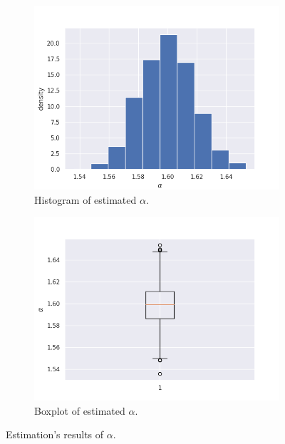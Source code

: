 \documentclass{article}
\begin{document}
	\begin{figure}
		\centering
		\begin{subfigure}[H]{0.49\textwidth}
			\centering
			\includegraphics[width=1\linewidth]{images/cf_alpha_estimation_hist}
			\caption{Histogram of estimated $\alpha$.}\label{9}
		\end{subfigure}
		\hfill
		\begin{subfigure}[H]{0.49\textwidth}
			\centering
			\includegraphics[width=1\linewidth]{images/cf_alpha_estimation_boxplot}
			\caption{Boxplot of estimated $\alpha$.}\label{10}
		\end{subfigure}\caption{Estimation's results of $\alpha$.}
	\end{figure}
	
\end{document}

